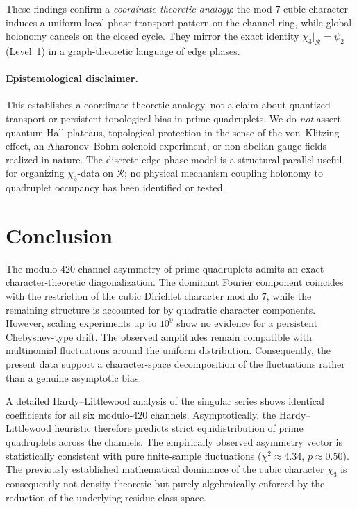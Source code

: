 \documentclass[11pt,a4paper]{article}
\newcommand{\R}{\mathcal{R}}
\begin{document}
These findings confirm a \emph{coordinate-theoretic analogy}: the mod-$7$ cubic
character induces a uniform local phase-transport pattern on the channel ring,
while global holonomy cancels on the closed cycle.
They mirror the exact identity $\chi_3|_{\R}=\psi_2$ (Level~1) in a
graph-theoretic language of edge phases.

\paragraph{Epistemological disclaimer.}
This establishes a coordinate-theoretic analogy, not a claim about quantized
transport or persistent topological bias in prime quadruplets.
We do \emph{not} assert quantum Hall plateaus, topological protection in the
sense of the von~Klitzing effect, an Aharonov--Bohm solenoid experiment, or
non-abelian gauge fields realized in nature.
The discrete edge-phase model is a structural parallel useful for organizing
$\chi_3$-data on $\R$; no physical mechanism coupling holonomy to quadruplet
occupancy has been identified or tested.

\section{Conclusion}

The modulo-$420$ channel asymmetry of prime quadruplets admits an exact
character-theoretic diagonalization.
The dominant Fourier component coincides with the restriction of the cubic
Dirichlet character modulo $7$, while the remaining structure is accounted
for by quadratic character components.
However, scaling experiments up to $10^9$ show no evidence for a persistent
Chebyshev-type drift.
The observed amplitudes remain compatible with multinomial fluctuations
around the uniform distribution.
Consequently, the present data support a character-space decomposition of
the fluctuations rather than a genuine asymptotic bias.

A detailed Hardy--Littlewood analysis of the singular series shows
identical coefficients for all six modulo-$420$ channels.
Asymptotically, the Hardy--Littlewood heuristic therefore predicts strict
equidistribution of prime quadruplets across the channels.
The empirically observed asymmetry vector is statistically consistent with
pure finite-sample fluctuations ($\chi^2 \approx 4.34$, $p \approx 0.50$).
The previously established mathematical dominance of the cubic character
$\chi_3$ is consequently not density-theoretic but purely algebraically
enforced by the reduction of the underlying residue-class space.
\end{document}
